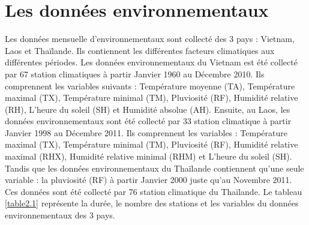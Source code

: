 \section{Les donn\'ees environnementaux}
Les données mensuelle d'environnementaux sont collecté des 3 pays : Vietnam, Laos et Thaïlande. Ils contiennent les différentes facteurs climatiques aux différentes périodes. Les données environnementaux du Vietnam est été collecté par 67 station climatiques à partir Janvier 1960  au Décembre 2010. Ils comprennent les variables suivants : Température moyenne (TA), Température maximal (TX), Température minimal (TM), Pluviosité (RF), Humidité relative (RH), L'heure du soleil (SH) et Humidité absolue (AH). Ensuite, au Laos, les données environnementaux sont été collecté par 33 station climatique à partir Janvier 1998 au Décembre 2011. Ils comprennent les variables : Température maximal (TX), Température minimal (TM), Pluviosité (RF), Humidité relative maximal (RHX), Humidité relative minimal (RHM) et L'heure du soleil (SH). Tandis que les données environnementaux du Thaïlande contiennent qu'une seule variable : la pluviosité (RF) à partir Janvier 2000 juste qu'au Novembre 2011. Ces données  sont été collecté par 76 station climatique du Thaïlande. Le tableau \ref{table2.1} représente la durée, le nombre des stations et les variables du données environnementaux des 3 pays. 
